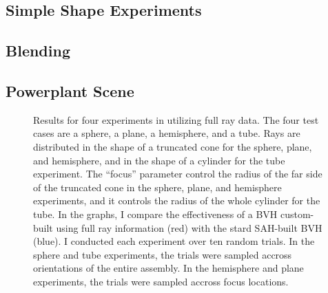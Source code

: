 \documentclass[twocolumn]{article}
\begin{document}
\subsection{Simple Shape Experiments}
\subsection{Blending}
\subsection{Powerplant Scene}

\begin{figure}
\caption{Results for four experiments in utilizing full ray data.  The four test cases are a sphere, a plane, a hemisphere, and a tube.  Rays are distributed in the shape of a truncated cone for the sphere, plane, and hemisphere, and in the shape of a cylinder for the tube experiment.  The ``focus'' parameter control the radius of the far side of the truncated cone in the sphere, plane, and hemisphere experiments, and it controls the radius of the whole cylinder for the tube.  In the graphs, I compare the effectiveness of a BVH custom-built using full ray information (red) with the stard SAH-built BVH (blue).  I conducted each experiment over ten random trials.  In the sphere and tube experiments, the trials were sampled accross orientations of the entire assembly. In the hemisphere and plane experiments, the trials were sampled accross focus locations.}


\end{figure}
\end{document}
